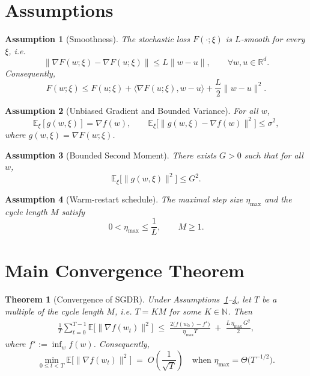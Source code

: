 \documentclass{article}
\newtheorem{theorem}{Theorem}
\newtheorem{assumption}{Assumption}
\newcommand{\E}{\mathbb{E}}
\newcommand{\R}{\mathbb{R}}
\begin{document}
\section*{Assumptions}
\begin{assumption}[Smoothness]\label{ass:smooth}
The stochastic loss $F(\cdot;\xi)$ is $L$‑smooth for every $\xi$, i.e.
\[
\|\nabla F(w;\xi)-\nabla F(u;\xi)\| \le L\|w-u\|,\qquad \forall w,u\in\R^d.
\]
Consequently,
\[
F(w;\xi) \le F(u;\xi)+\langle\nabla F(u;\xi),w-u\rangle+\frac{L}{2}\|w-u\|^2 .
\]
\end{assumption}

\begin{assumption}[Unbiased Gradient and Bounded Variance]\label{ass:unbiased}
For all $w$, 
\[
\E_{\xi}[g(w,\xi)] = \nabla f(w),\qquad 
\E_{\xi}\bigl[\|g(w,\xi)-\nabla f(w)\|^2\bigr]\le\sigma^2,
\]
where $g(w,\xi)=\nabla F(w;\xi)$.
\end{assumption}

\begin{assumption}[Bounded Second Moment]\label{ass:second}
There exists $G>0$ such that for all $w$,
\[
\E_{\xi}\bigl[\|g(w,\xi)\|^2\bigr]\le G^2.
\]
\end{assumption}

\begin{assumption}[Warm‑restart schedule]\label{ass:schedule}
The maximal step size $\eta_{\max}$ and the cycle length $M$ satisfy
\[
0<\eta_{\max}\le \frac{1}{L},\qquad M\ge 1.
\]
\end{assumption}

\section*{Main Convergence Theorem}
\begin{theorem}[Convergence of SGDR]\label{thm:sgdr}
Under Assumptions~\ref{ass:smooth}--\ref{ass:schedule}, let $T$ be a multiple of the cycle length $M$, i.e. $T=K M$ for some $K\in\mathbb{N}$. Then
\begin{align}
\frac{1}{T}\sum_{t=0}^{T-1}\E\bigl[\|\nabla f(w_t)\|^2\bigr]
\;\le\;
\frac{2\bigl(f(w_0)-f^\star\bigr)}{\eta_{\max} T}
\;+\;
\frac{L\,\eta_{\max}\,G^2}{2},
\tag{1}
\end{align}
where $f^\star:=\inf_{w}f(w)$. Consequently,
\[
\min_{0\le t<T}\E\bigl[\|\nabla f(w_t)\|^2\bigr]
\;=\; O\!\left(\frac{1}{\sqrt{T}}\right)
\quad\text{when }\eta_{\max}= \Theta\!\bigl(T^{-1/2}\bigr).
\]
\end{theorem}
\end{document}
